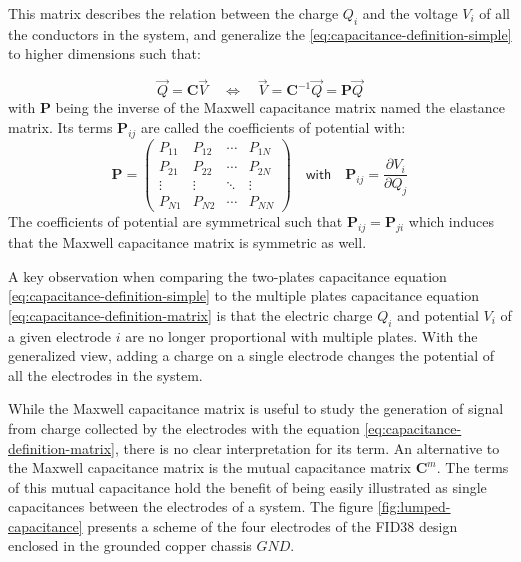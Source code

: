 This matrix describes the relation between the charge $Q_i$ and the voltage $V_i$ of all the conductors in the system, and generalize the \ref{eq:capacitance-definition-simple} to higher dimensions such that:

\begin{equation} 
\label{eq:capacitance-definition-matrix}
\vec{Q} =
\bm{C} \vec{V}
\quad \Leftrightarrow \quad
\vec{V} =
\bm{C}^{-1} \vec{Q} = \bm{P} \vec{Q}
\end{equation}
with $\bm{P}$ being the inverse of the Maxwell capacitance matrix named the elastance matrix. Its terms $\bm{P}_{ij}$ are called the coefficients of potential with:
\begin{equation}
\label{eq:elastance-matrix}
\bm{P} =
\begin{pmatrix}
P_{11} & P_{12} & \cdots & P_{1N} \\ 
P_{21} & P_{22} & \cdots & P_{2N} \\ 
\vdots & \vdots & \ddots & \vdots \\ 
P_{N1} & P_{N2} & \cdots & P_{NN}
\end{pmatrix}
\quad \textsf{with} \quad
\bm{P}_{ij} = \frac{\partial V_i}{\partial Q_j}
\end{equation}
The coefficients of potential are symmetrical such that  $\bm{P}_{ij} = \bm{P}_{ji}$ which induces that the Maxwell capacitance matrix is symmetric as well.

A key observation when comparing the two-plates capacitance equation \ref{eq:capacitance-definition-simple} to the multiple plates capacitance equation \ref{eq:capacitance-definition-matrix} is that the electric charge $Q_i$ and potential $V_i$ of a given electrode $i$ are no longer proportional with multiple plates. With the generalized view, adding a charge on a single electrode changes the potential of all the electrodes in the system.

While the Maxwell capacitance matrix is useful to study the generation of signal from charge collected by the electrodes with the equation \ref{eq:capacitance-definition-matrix}, there is no clear interpretation for its term. An alternative to the Maxwell capacitance matrix is the mutual capacitance matrix $\bm{C}^m$. The terms of this mutual capacitance hold the benefit of being easily illustrated as single capacitances between the electrodes of a system. The figure \ref{fig:lumped-capacitance} presents a scheme of the four electrodes of the FID38 design enclosed in the grounded copper chassis $GND$.

